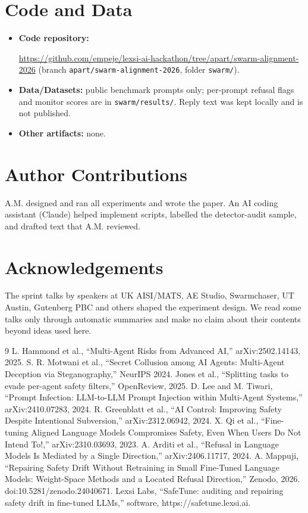 \documentclass[11pt,letterpaper]{article}
\begin{document}
\section*{Code and Data}
\begin{itemize}[leftmargin=2em,itemsep=1pt]
\item \textbf{Code repository:} \raggedright\url{https://github.com/empeje/lexsi-ai-hackathon/tree/apart/swarm-alignment-2026} (branch \texttt{apart/swarm-alignment-2026}, folder \texttt{swarm/}).
\item \textbf{Data/Datasets:} public benchmark prompts only; per-prompt refusal flags and monitor scores are in \texttt{swarm/results/}. Reply text was kept locally and is not published.
\item \textbf{Other artifacts:} none.
\end{itemize}

\section*{Author Contributions}
A.M. designed and ran all experiments and wrote the paper. An AI coding assistant (Claude) helped implement scripts, labelled the detector-audit sample, and drafted text that A.M. reviewed.

\section*{Acknowledgements}
The sprint talks by speakers at UK AISI/MATS, AE Studio, Swarmchaser, UT Austin, Gutenberg PBC and others shaped the experiment design. We read some talks only through automatic summaries and make no claim about their contents beyond ideas used here.

\begin{thebibliography}{9}\small
{} L. Hammond et al., ``Multi-Agent Risks from Advanced AI,'' arXiv:2502.14143, 2025.
 S. R. Motwani et al., ``Secret Collusion among AI Agents: Multi-Agent Deception via Steganography,'' NeurIPS 2024.
 Jones et al., ``Splitting tasks to evade per-agent safety filters,'' OpenReview, 2025.
 D. Lee and M. Tiwari, ``Prompt Infection: LLM-to-LLM Prompt Injection within Multi-Agent Systems,'' arXiv:2410.07283, 2024.
 R. Greenblatt et al., ``AI Control: Improving Safety Despite Intentional Subversion,'' arXiv:2312.06942, 2024.
 X. Qi et al., ``Fine-tuning Aligned Language Models Compromises Safety, Even When Users Do Not Intend To!,'' arXiv:2310.03693, 2023.
 A. Arditi et al., ``Refusal in Language Models Is Mediated by a Single Direction,'' arXiv:2406.11717, 2024.
 A. Mappuji, ``Repairing Safety Drift Without Retraining in Small Fine-Tuned Language Models: Weight-Space Methods and a Located Refusal Direction,'' Zenodo, 2026. doi:10.5281/zenodo.24040671.
 Lexsi Labs, ``SafeTune: auditing and repairing safety drift in fine-tuned LLMs,'' software, https://safetune.lexsi.ai.
\end{thebibliography}
\end{document}
